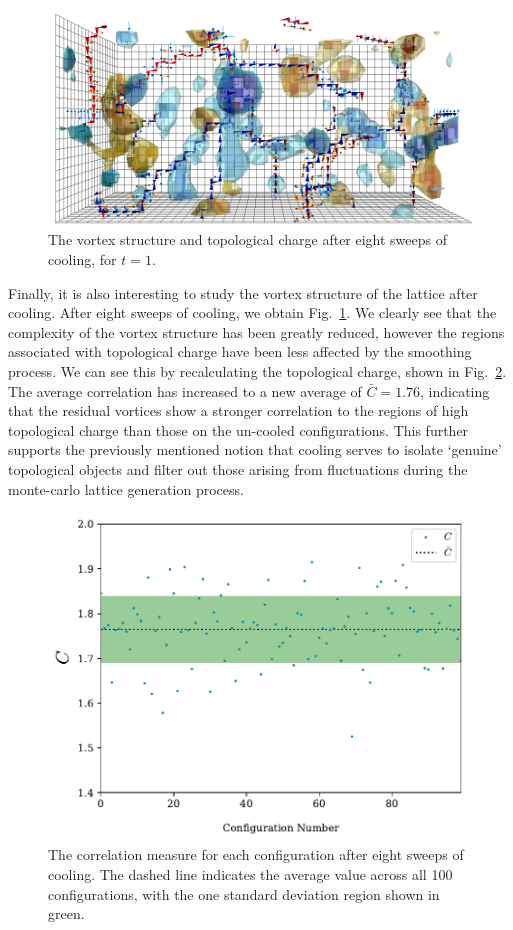 \begin{figure}[H]
\centering
\includegraphics[width=\linewidth]{./PlaqLinkTopQ_CFG95_T01_8SW.png}
\caption{\label{fig:PlaqLinkTopQ_SW8}The vortex structure and topological charge after eight sweeps of cooling, for $t=1$.}
\end{figure}
%

Finally, it is also interesting to study the vortex structure of the lattice after cooling. After eight sweeps of cooling, we obtain Fig.~\ref{fig:PlaqLinkTopQ_SW8}. We clearly see that the complexity of the vortex structure has been greatly reduced, however the regions associated with topological charge have been less affected by the smoothing process. We can see this by recalculating the topological charge, shown in Fig.~\ref{fig:Correlation_sw07}. The average correlation has increased to a new average of $\bar{C}=1.76$, indicating that the residual vortices show a stronger correlation to the regions of high topological charge than those on the un-cooled configurations. This further supports the previously mentioned notion that cooling serves to isolate `genuine' topological objects and filter out those arising from fluctuations during the monte-carlo lattice generation process.
%

\begin{figure}[H]
\centering
\includegraphics[width=0.8\linewidth]{./Correlation_sw07.pdf}
\caption[The correlation measure for each configuration after eight sweeps of cooling.]{\label{fig:Correlation_sw07}The correlation measure for each configuration after eight sweeps of cooling. The dashed line indicates the average value across all 100 configurations, with the one standard deviation region shown in green.}
\end{figure}

